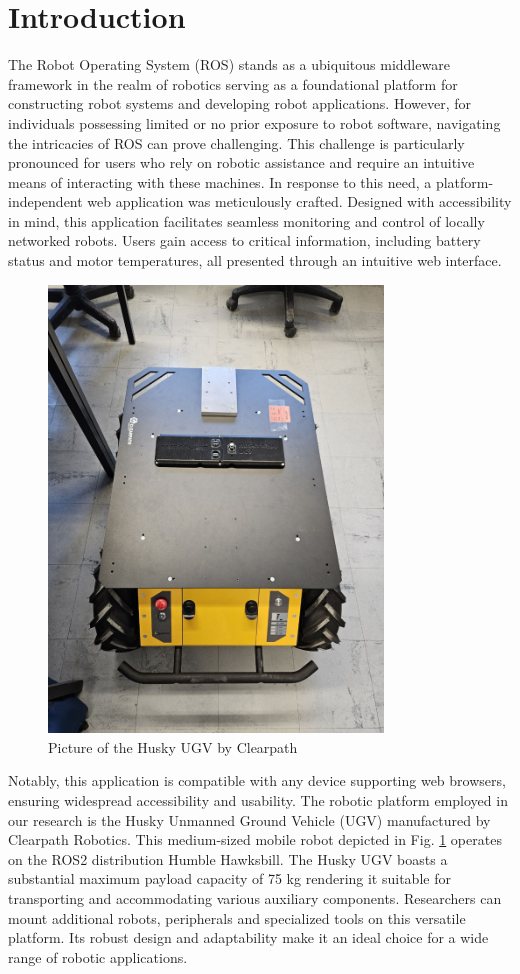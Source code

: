 \documentclass[conference]{IEEEtran}
\begin{document}
\section{Introduction}
The Robot Operating System (ROS) stands as a ubiquitous middleware framework in the realm of robotics serving as a foundational platform for constructing robot systems and developing robot applications. 
However, for individuals possessing limited or no prior exposure to robot software, navigating the intricacies of ROS can prove challenging. 
This challenge is particularly pronounced for users who rely on robotic assistance and require an intuitive means of interacting with these machines.
In response to this need, a platform-independent web application was meticulously crafted. 
Designed with accessibility in mind, this application facilitates seamless monitoring and control of locally networked robots. Users gain access to critical information, including battery status and motor temperatures, all presented through an intuitive web interface. 
\begin{figure}[htbp]
    \centerline{\includegraphics[width=8.9cm]{Pictures/husky_costum.jpeg}}
    \caption{Picture of the Husky UGV by Clearpath}
    \label{fig:huskyClearpath}
\end{figure}
Notably, this application is compatible with any device supporting web browsers, ensuring widespread accessibility and usability.
The robotic platform employed in our research is the Husky Unmanned Ground Vehicle (UGV) manufactured by Clearpath Robotics. This medium-sized mobile robot depicted in Fig. \ref{fig:huskyClearpath} operates on the ROS2 distribution Humble Hawksbill.
The Husky UGV boasts a substantial maximum payload capacity of 75 kg rendering it suitable for transporting and accommodating various auxiliary components. Researchers can mount additional robots, peripherals and specialized tools on this versatile platform. Its robust design and adaptability make it an ideal choice for a wide range of robotic applications\cite{huskyClearpath}. 
\end{document}
